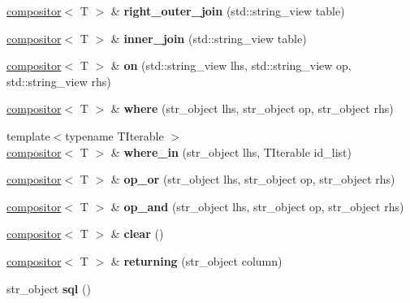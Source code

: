 \begin{DoxyCompactItemize}
\hyperlink{structmods_1_1sql_1_1compositor}{compositor}$<$ T $>$ \& {\bfseries right\+\_\+outer\+\_\+join} (std\+::string\+\_\+view table)
\item 
\mbox{\label{structmods_1_1sql_1_1compositor_a16ecb76cda33af5bad957577756c4fb5}} 
\hyperlink{structmods_1_1sql_1_1compositor}{compositor}$<$ T $>$ \& {\bfseries inner\+\_\+join} (std\+::string\+\_\+view table)
\item 
\mbox{\label{structmods_1_1sql_1_1compositor_a6618efa009a4a55704cdd847ea2494ae}} 
\hyperlink{structmods_1_1sql_1_1compositor}{compositor}$<$ T $>$ \& {\bfseries on} (std\+::string\+\_\+view lhs, std\+::string\+\_\+view op, std\+::string\+\_\+view rhs)
\item 
\mbox{\label{structmods_1_1sql_1_1compositor_a6d265a6c5343371660726b85377ccf94}} 
\hyperlink{structmods_1_1sql_1_1compositor}{compositor}$<$ T $>$ \& {\bfseries where} (str\+\_\+object lhs, str\+\_\+object op, str\+\_\+object rhs)
\item 
\mbox{\label{structmods_1_1sql_1_1compositor_a1721e37d44c4748677f3906c9bdf8610}} 
{\footnotesize template$<$typename T\+Iterable $>$ }\\\hyperlink{structmods_1_1sql_1_1compositor}{compositor}$<$ T $>$ \& {\bfseries where\+\_\+in} (str\+\_\+object lhs, T\+Iterable id\+\_\+list)
\item 
\mbox{\label{structmods_1_1sql_1_1compositor_a4559139b436161d5f6d19d6d323a7b66}} 
\hyperlink{structmods_1_1sql_1_1compositor}{compositor}$<$ T $>$ \& {\bfseries op\+\_\+or} (str\+\_\+object lhs, str\+\_\+object op, str\+\_\+object rhs)
\item 
\mbox{\label{structmods_1_1sql_1_1compositor_a7754dac7cc992a3ed14e3f80333c494a}} 
\hyperlink{structmods_1_1sql_1_1compositor}{compositor}$<$ T $>$ \& {\bfseries op\+\_\+and} (str\+\_\+object lhs, str\+\_\+object op, str\+\_\+object rhs)
\item 
\mbox{\label{structmods_1_1sql_1_1compositor_acb44a8354946279829cb768ab0e450ca}} 
\hyperlink{structmods_1_1sql_1_1compositor}{compositor}$<$ T $>$ \& {\bfseries clear} ()
\item 
\mbox{\label{structmods_1_1sql_1_1compositor_a75ce21f201a5097e4e494b9edaaa3a56}} 
\hyperlink{structmods_1_1sql_1_1compositor}{compositor}$<$ T $>$ \& {\bfseries returning} (str\+\_\+object column)
\item 
\mbox{\label{structmods_1_1sql_1_1compositor_ac46d889f31d0a483f271b9599233eec2}} 
str\+\_\+object {\bfseries sql} ()
\end{DoxyCompactItemize}
